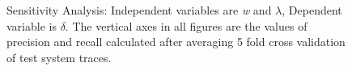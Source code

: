 \begin{figure}
    \centering
    \qquad
    \caption{Sensitivity Analysis: Independent variables are \textit{w} and $\lambda$, Dependent variable is $\delta$. The vertical axes in all figures are the values of precision and recall calculated after averaging 5 fold cross validation of test system traces.}%
    \label{fig:sensitivityAnalysis_2}%
\end{figure}

